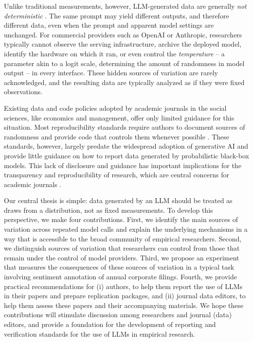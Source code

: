 \documentclass[11pt]{article}
\begin{document}
Unlike traditional measurements, however, LLM-generated data are generally \textit{not deterministic} \citep{ouyang2024,he2025,deKokMS2025}. The same prompt may yield different outputs, and therefore different data, even when the prompt and apparent model settings are unchanged. For commercial providers such as OpenAI or Anthropic, researchers typically cannot observe the serving infrastructure, archive the deployed model, identify the hardware on which it ran, or even control the \textit{temperature} -- a parameter akin to a logit scale, determining the amount of randomness in model output -- in every interface. These hidden sources of variation are rarely acknowledged, and the resulting data are typically analyzed as if they were fixed observations.\medskip

Existing data and code policies adopted by academic journals in the social sciences, like economics and management, offer only limited guidance for this situation. Most reproducibility standards require authors to document sources of randomness and provide code that controls them whenever possible \citep{vilhuber2019,koren2022,vilhuber2022}. These standards, however, largely predate the widespread adoption of generative AI and provide little guidance on how to report data generated by probabilistic black-box models. This lack of disclosure and guidance has important implications for the transparency and reproducibility of research, which are central concerns for academic journals \citep{fivsar2024reproducibility,loch2025reinforcing}.\medskip 

Our central thesis is simple: data generated by an LLM should be treated as draws from a distribution, not as fixed measurements. To develop this perspective, we make four contributions. First, we identify the main sources of variation across repeated model calls and explain the underlying mechanisms in a way that is accessible to the broad community of empirical researchers. Second, we distinguish sources of variation that researchers can control from those that remain under the control of model providers. Third, we propose an experiment that measures the consequences of these sources of variation in a typical task involving sentiment annotation of annual corporate filings. Fourth, we provide practical recommendations for (i) authors, to help them report the use of LLMs in their papers and prepare replication packages, and (ii) journal data editors, to help them assess these papers and their accompanying materials. We hope these contributions will stimulate discussion among researchers and journal (data) editors, and provide a foundation for the development of reporting and verification standards for the use of LLMs in empirical research.\medskip
\end{document}
